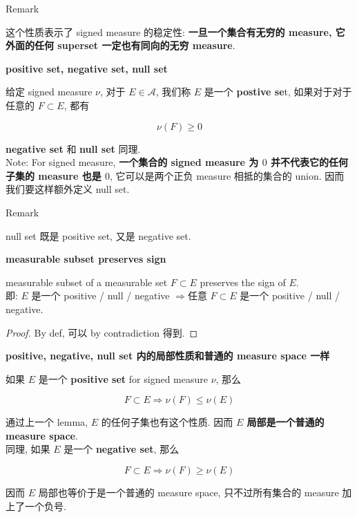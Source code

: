 \documentclass{qlnotes-export}
\begin{document}
\begin{qlremark}{Remark}

这个性质表示了 signed measure 的稳定性: \textbf{一旦一个集合有无穷的 measure, 它外面的任何 superset 一定也有同向的无穷 measure}.

\end{qlremark}

\begin{definition}{\protect{}\label{kn-positive-set-negative-set-null-set}{\textbf{positive
set, negative set, null set}}}

给定 signed measure \(\nu\), 对于 \(E \in \mathcal{A}\), 我们称 \(E\) 是一个 \textbf{postive se}t, 如果对于对于任意的 \(F \subset E\), 都有

\[\nu(F) \geq 0\]

\textbf{negative set} 和 \textbf{null set} 同理.\\
Note: For signed measure, \textbf{一个集合的 signed measure 为 \(0\) 并不代表它的任何子集的 measure 也是 \(0\)}, 它可以是两个正负 measure 相抵的集合的 union. 因而我们要这样额外定义 null set.

\end{definition}

\begin{qlremark}{Remark}

null set 既是 positive set, 又是 negative set.

\end{qlremark}

\begin{lemma}{\protect{}\label{kn-measurable-subset-preserves-sign}{\textbf{measurable
subset preserves sign}}}

measurable subset of a measurable set \(F \subset E\) preserves the sign of \(E\).\\
即: \(E\) 是一个 positive / null / negative \(\Longrightarrow\)任意 \(F \subset E\) 是一个 positive / null / negative.

\end{lemma}

\begin{proof}

By def, 可以 by contradiction 得到.

\end{proof}

\begin{lemma}{\protect{}\label{kn-positive-negative-null-set-measure-space}{\textbf{positive,
negative, null set 内的局部性质和普通的 measure space 一样}}}

如果 \(E\) 是一个 \textbf{positive set} for signed measure \(\nu\), 那么

\[F \subset E\Longrightarrow\nu(F) \leq \nu(E)\]

通过上一个 lemma, \(E\) 的任何子集也有这个性质. 因而 \textbf{\(E\) 局部是一个普通的 measure space}.\\
同理, 如果 \(E\) 是一个 \textbf{negative set}, 那么

\[F \subset E\Longrightarrow\nu(F) \geq \nu(E)\]

因而 \(E\) 局部也等价于是一个普通的 measure space, 只不过所有集合的 measure 加上了一个负号.

\end{lemma}
\end{document}
